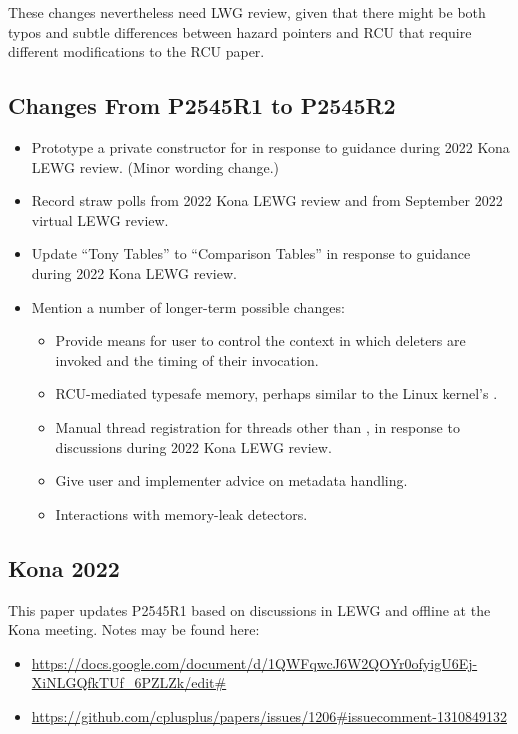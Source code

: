 These changes nevertheless need LWG review, given that there might be
both typos and subtle differences between hazard pointers and RCU that
require different modifications to the RCU paper.

\subsection{Changes From P2545R1 to P2545R2}
\label{sec:Changes From P2545R1 to P2545R2}

\begin{itemize}
\item	Prototype a private constructor for  in response
	to guidance during 2022 Kona LEWG review.
	(Minor wording change.)
\item	Record straw polls from 2022 Kona LEWG review and from
	September 2022 virtual LEWG review.
\item	Update ``Tony Tables'' to ``Comparison Tables'' in response to
	guidance during 2022 Kona LEWG review.
\item	Mention a number of longer-term possible changes:
	\begin{itemize}
	\item	Provide means for user to control the context in
		which deleters are invoked and the timing of their
		invocation.
	\item	RCU-mediated typesafe memory, perhaps similar to the
		Linux kernel's .
	\item	Manual thread registration for threads other than
		, in response to discussions during
		2022 Kona LEWG review.
	\item	Give user and implementer advice on 
		metadata handling.
	\item	Interactions with memory-leak detectors.
	\end{itemize}
\end{itemize}

\subsection{Kona 2022}
\label{sec:Kona 2022}

This paper updates P2545R1 based on discussions in LEWG and offline
at the Kona meeting.
Notes may be found here:

\begin{itemize}
\item	\url{https://docs.google.com/document/d/1QWFqwcJ6W2QOYr0ofyigU6Ej-XiNLGQfkTUf_6PZLZk/edit#}
\item	\url{https://github.com/cplusplus/papers/issues/1206#issuecomment-1310849132}
\end{itemize}

